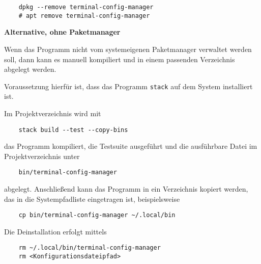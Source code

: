 \begin{verbatim}
	dpkg --remove terminal-config-manager
	# apt remove terminal-config-manager
\end{verbatim}

\begin{center}
	\textbf{Alternative, ohne Paketmanager}
\end{center}

Wenn das Programm nicht vom systemeigenen Paketmanager verwaltet werden
soll, dann kann es manuell kompiliert und in einem passenden
Verzeichnis abgelegt werden.

Voraussetzung hierfür ist, dass das Programm \texttt{stack} auf dem
System installiert ist.

Im Projektverzeichnis wird mit

\begin{verbatim}
	stack build --test --copy-bins
\end{verbatim}

das Programm kompiliert, die Testsuite ausgeführt und die ausführbare Datei im
Projektverzeichnis unter

\begin{verbatim}
	bin/terminal-config-manager
\end{verbatim}

abgelegt. Anschließend kann das Programm in ein Verzeichnis kopiert werden, das in die
Systempfadliste eingetragen ist, beispielsweise

\begin{verbatim}
	cp bin/terminal-config-manager ~/.local/bin
\end{verbatim}

Die Deinstallation erfolgt mittels

\begin{verbatim}
	rm ~/.local/bin/terminal-config-manager
	rm <Konfigurationsdateipfad>
\end{verbatim}